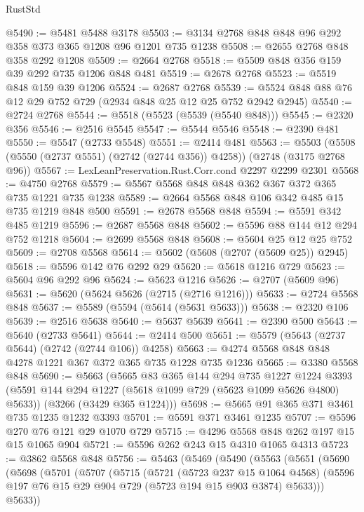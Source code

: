\begin{lexlean}{RustStd}
\begin{coremodule}
@5490 := @5481 @5488 @3178
@5503 := @3134 @2768 @848 @848 @96 @292 @358 @373 @365 @1208 @96 @1201 @735 @1238
@5508 := @2655 @2768 @848 @358 @292 @1208
@5509 := @2664 @2768
@5518 := @5509 @848 @356 @159 @39 @292 @735 @1206 @848 @481
@5519 := @2678 @2768
@5523 := @5519 @848 @159 @39 @1206
@5524 := @2687 @2768
@5539 := @5524 @848 @88 @76 @12 @29 @752 @729 (@2934 @848 @25 @12 @25 @752 @2942 @2945)
@5540 := @2724 @2768
@5544 := @5518 (@5523 (@5539 (@5540 @848)))
@5545 := @2320 @356
@5546 := @2516 @5545
@5547 := @5544 @5546
@5548 := @2390 @481
@5550 := @5547 (@2733 @5548)
@5551 := @2414 @481
@5563 := @5503 (@5508 (@5550 (@2737 @5551) (@2742 (@2744 @356)) @4258)) (@2748 (@3175 @2768 @96))
@5567 := LexLeanPreservation.Rust.Corr.cond @2297 @2299 @2301
@5568 := @4750 @2768
@5579 := @5567 @5568 @848 @848 @362 @367 @372 @365 @735 @1221 @735 @1238
@5589 := @2664 @5568 @848 @106 @342 @485 @15 @735 @1219 @848 @500
@5591 := @2678 @5568 @848
@5594 := @5591 @342 @485 @1219
@5596 := @2687 @5568 @848
@5602 := @5596 @88 @144 @12 @294 @752 @1218
@5604 := @2699 @5568 @848
@5608 := @5604 @25 @12 @25 @752
@5609 := @2708 @5568
@5614 := @5602 (@5608 (@2707 (@5609 @25)) @2945)
@5618 := @5596 @142 @76 @292 @29
@5620 := @5618 @1216 @729
@5623 := @5604 @96 @292 @96
@5624 := @5623 @1216
@5626 := @2707 (@5609 @96)
@5631 := @5620 (@5624 @5626 (@2715 (@2716 @1216)))
@5633 := @2724 @5568 @848
@5637 := @5589 (@5594 (@5614 (@5631 @5633)))
@5638 := @2320 @106
@5639 := @2516 @5638
@5640 := @5637 @5639
@5641 := @2390 @500
@5643 := @5640 (@2733 @5641)
@5644 := @2414 @500
@5651 := @5579 (@5643 (@2737 @5644) (@2742 (@2744 @106)) @4258)
@5663 := @4274 @5568 @848 @848 @4278 @1221 @367 @372 @365 @735 @1228 @735 @1236
@5665 := @3380 @5568 @848
@5690 := @5663
    (@5665
      @83
      @365
      @144
      @294
      @735
      @1227
      @1224
      @3393
      (@5591 @144 @294 @1227 (@5618 @1099 @729 (@5623 @1099 @5626 @4800) @5633))
      (@3266 (@3429 @365 @1224)))
@5698 := @5665 @91 @365 @371 @3461 @735 @1235 @1232 @3393
@5701 := @5591 @371 @3461 @1235
@5707 := @5596 @270 @76 @121 @29 @1070 @729
@5715 := @4296 @5568 @848 @262 @197 @15 @15 @1065 @904
@5721 := @5596 @262 @243 @15 @4310 @1065 @4313
@5723 := @3862 @5568 @848
@5756 := @5463
    (@5469
      (@5490
        (@5563
          (@5651
            (@5690
              (@5698
                (@5701
                  (@5707
                    (@5715
                      (@5721
                        (@5723 @237 @15 @1064 @4568)
                        (@5596 @197 @76 @15 @29 @904 @729 (@5723 @194 @15 @903 @3874) @5633)))
                    @5633))

\end{coremodule}
\end{lexlean}
